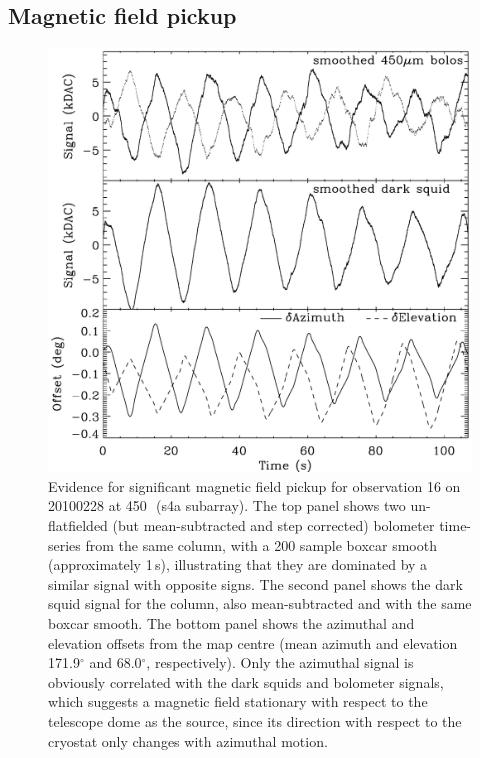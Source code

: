 \documentclass[useAMS,usenatbib,nofootinbib]{mn2e}
\begin{document}
\subsection{Magnetic field pickup}
\label{sec:magpickup}

\begin{figure}
\centering
\includegraphics[width=\linewidth]{magpickup.pdf}
\caption{Evidence for significant magnetic field pickup for
  observation 16 on 20100228 at 450\,\micron\ (s4a subarray).  The top
  panel shows two un-flatfielded (but mean-subtracted and step
  corrected) bolometer time-series from the same column, with a 200
  sample boxcar smooth (approximately 1\,s), illustrating that they
  are dominated by a similar signal with opposite signs. The second
  panel shows the dark squid signal for the column, also
  mean-subtracted and with the same boxcar smooth. The bottom panel
  shows the azimuthal and elevation offsets from the map centre (mean
  azimuth and elevation 171.9$^\circ$ and 68.0$^\circ$,
  respectively). Only the azimuthal signal is obviously correlated
  with the dark squids and bolometer signals, which suggests a
  magnetic field stationary with respect to the telescope dome as the
  source, since its direction with respect to the cryostat only
  changes with azimuthal motion.}
\label{fig:magpickup}
\end{figure}
\end{document}
